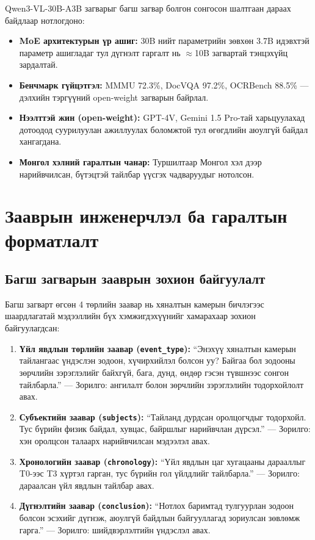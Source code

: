 Qwen3-VL-30B-A3B загварыг багш загвар болгон сонгосон шалтгаан дараах байдлаар нотлогдоно:

\begin{itemize}
    \item \textbf{MoE архитектурын үр ашиг:} 30B нийт параметрийн зөвхөн 3.7B идэвхтэй параметр ашигладаг тул дүгнэлт гаргалт нь $\approx$10B загвартай тэнцэхүйц зардалтай.
    \item \textbf{Бенчмарк гүйцэтгэл:} MMMU 72.3\%, DocVQA 97.2\%, OCRBench 88.5\% --- дэлхийн тэргүүний open-weight загварын байрлал.
    \item \textbf{Нээлттэй жин (open-weight):} GPT-4V, Gemini 1.5 Pro-тай харьцуулахад дотоодод суурилуулан ажиллуулах боломжтой тул өгөгдлийн аюулгүй байдал хангагдана.
    \item \textbf{Монгол хэлний гаралтын чанар:} Туршилтаар Монгол хэл дээр нарийвчилсан, бүтэцтэй тайлбар үүсгэх чадваруудыг нотолсон.
\end{itemize}

\section{Зааврын инженерчлэл ба гаралтын форматлалт}

\subsection{Багш загварын зааврын зохион байгуулалт}

Багш загварт өгсөн 4 төрлийн заавар нь хяналтын камерын бичлэгээс шаардлагатай мэдээллийн бүх хэмжигдэхүүнийг хамарахаар зохион байгуулагдсан:

\begin{enumerate}
    \item \textbf{Үйл явдлын төрлийн заавар (\texttt{event\_type}):} ``Энэхүү хяналтын камерын тайлангаас үндэслэн зодоон, хүчирхийлэл болсон уу? Байгаа бол зодооны зөрчлийн зэрэглэлийг байхгүй, бага, дунд, өндөр гэсэн түвшнээс сонгон тайлбарла.'' --- Зорилго: ангилалт болон зөрчлийн зэрэглэлийн тодорхойлолт авах.

    \item \textbf{Субъектийн заавар (\texttt{subjects}):} ``Тайланд дурдсан оролцогчдыг тодорхойл. Тус бүрийн физик байдал, хувцас, байршлыг нарийвчлан дүрсэл.'' --- Зорилго: хэн оролцсон талаарх нарийвчилсан мэдээлэл авах.

    \item \textbf{Хронологийн заавар (\texttt{chronology}):} ``Үйл явдлын цаг хугацааны дарааллыг T0-ээс T3 хүртэл гарган, тус бүрийн гол үйлдлийг тайлбарла.'' --- Зорилго: дараалсан үйл явдлын тайлбар авах.

    \item \textbf{Дүгнэлтийн заавар (\texttt{conclusion}):} ``Нотлох баримтад тулгуурлан зодоон болсон эсэхийг дүгнэж, аюулгүй байдлын байгууллагад зориулсан зөвлөмж гарга.'' --- Зорилго: шийдвэрлэлтийн үндэслэл авах.
\end{enumerate}

